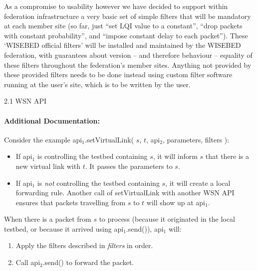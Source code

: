 \begin{apidoc}
{		%
		
		As a compromise to usability however we have decided to support within federation infrastructure a very basic set of simple filters that will be mandatory at each member site (so far, just ``set LQI value to a constant'', ``drop packets with constant probability'', and ``impose constant delay to each packet''). These `WISEBED official filters' will be installed and maintained by the WISEBED federation, with guarantees about version -- and therefore behaviour -- equality of these filters throughout the federation's member sites. Anything not provided by these provided filters needs to be done instead using custom filter software running at the user's site, which is to be written by the user.	
	} %
	{2.1 WSN API} %
\end{apidoc}

\paragraph{Additional Documentation:} 
Consider the example api$_1$.setVirtualLink( $s$, $t$, api$_2$, parameters, filters ):
	\begin{itemize}
		\item If api$_1$ is controlling the testbed containing $s$, it will inform $s$ that there is a new virtual link with $t$. It passes the parameters to $s$.
		\item If api$_1$ is {\em not} controlling the testbed containing $s$, it will create a local forwarding rule. Another call of setVirtualLink with another WSN API ensures that packets travelling from $s$ to $t$ will show up at api$_1$.
	\end{itemize} 
When there is a packet from $s$ to process (because it originated in the local testbed, or because it arrived using api$_1$.send()), api$_1$ will:
	\begin{enumerate}
		\item Apply the filters described in {\em filters} in order.
		\item Call api$_2$.send() to forward the packet.
	\end{enumerate}
	
